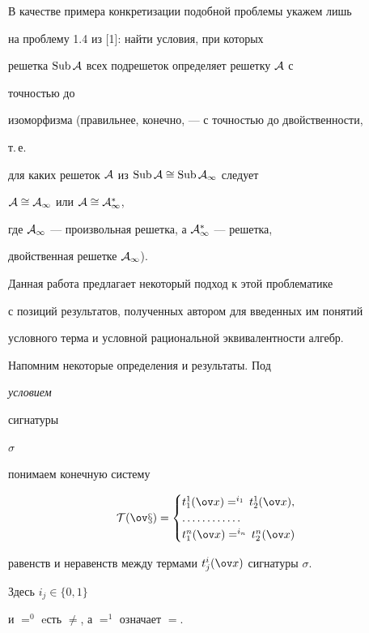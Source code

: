  


В качестве примера конкретизации подобной проблемы укажем лишь 


на проблему 1.4 из [1]: найти условия, при которых 


решетка $\operatorname{Sub}\cal A$ всех подрешеток определяет решетку $\cal A$ с 


точностью до 


изоморфизма (правильнее, конечно, --- с точностью до двойственности, 


т.\,е. 


для каких решеток $\cal A$ из $\operatorname{Sub}\cal A\cong\operatorname{Sub}\cal A_1$ следует 


$\cal A\cong\cal A_1$ или $\cal A\cong\cal A^*_1$, 


где $\cal A_1$ --- произвольная решетка, а $\cal A^*_1$ --- решетка, 


двойственная решетке $\cal A_1$). 


Данная работа предлагает некоторый подход к этой проблематике 


с позиций результатов, полученных автором для введенных им понятий 


условного терма и условной рациональной эквивалентности алгебр. 


 


Напомним некоторые определения и результаты. Под {\it условием 


сигнатуры} $\sigma$ 


понимаем конечную систему 


$$ 


\cal T(\ov x)= 


\begin{cases} 


t^1_1(\ov x)=^{i_1}\,t^1_2(\ov x),\\ 


\dotsc\dotsc\dotsc\dotsc \\ 


t^n_1(\ov x)=^{i_n}\,t^n_2(\ov x) 


\end{cases} 


$$ 


равенств и неравенств между термами $t^i_j(\ov x)$ сигнатуры $\sigma$. 


Здесь $i_j\in\{0,1\}$ 


и $=^0$ eсть $\ne$, а $=^1$ означает $=$. 


 



